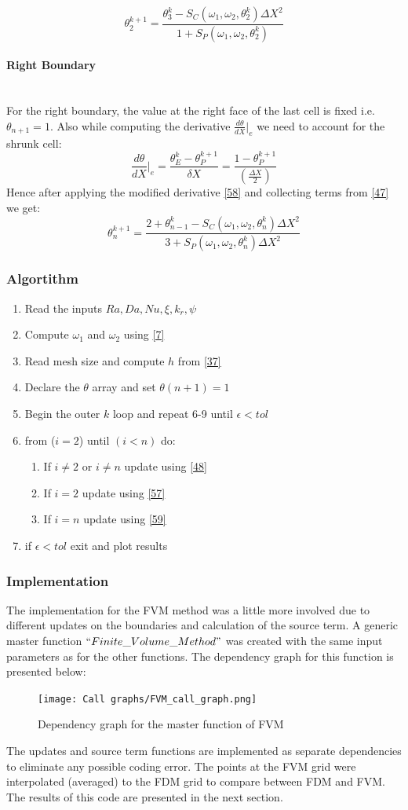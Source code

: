 \documentclass[12pt]{article}
\newcommand{\subsubsubsection}[1]{\paragraph{#1}\mbox{}\\}
\begin{document}
\[
\theta_2^{k+1} = \frac{\theta_3^k - S_C(\omega_1,\omega_2,\theta_2^k) \Delta X^2}{1 + S_P(\omega_1, \omega_2, \theta_2^k)} \label{57} \tag{57}
\]
\subsubsubsection{Right Boundary}
For the right boundary, the value at the right face of the last cell is fixed i.e. $\theta_{n+1} = 1$. Also while computing the derivative $\frac{d\theta}{dX}\Bigr|_e$ we need to account for the shrunk cell: 
\[
\frac{d\theta}{dX}\Bigr|_e = \frac{\theta_E^{k}-\theta_P^{k+1}}{\delta X} \tag{58} = \frac{1-\theta_P^{k+1}}{\left(\frac{\Delta X}{2}\right)}\label{58}
\]
Hence after applying the modified derivative \eqref{58} and collecting terms from \eqref{47} we get: 
\[
\theta_n^{k+1} = \frac{2 + \theta_{n-1}^k - S_C(\omega_1,\omega_2,\theta_n^k) \Delta X^2}{3 + S_P(\omega_1,\omega_2,\theta_n^k) \Delta X^2} \label{59} \tag{59}
\]
\subsubsection{Algortithm}
\begin{enumerate}
    \item Read the inputs $Ra, Da, Nu, \xi, k_r, \psi$
    \item Compute $\omega_1$ and $\omega_2$ using \eqref{7}
    \item Read mesh size and compute $h$ from \eqref{37}
    \item Declare the $\theta$ array and set $\theta(n+1)=1$
    \item Begin the outer $k$ loop and repeat 6-9 until $\epsilon<tol$
    \item from ($i=2$) until $(i<n)$ do: 
    \begin{enumerate}
        \item If $i\neq2$ or $i\neq n$ update using \eqref{48}
        \item If $i=2$ update using \eqref{57}
        \item If $i=n$ update using \eqref{59}
    \end{enumerate}
    \item if $\epsilon<tol$ exit and plot results
\end{enumerate}
\subsubsection{Implementation}
The implementation for the FVM method was a little more involved due to different updates on the boundaries and calculation of the source term. A generic master function $``Finite\_Volume\_Method"$ was created with the same input parameters as for the other functions. The dependency graph for this function is presented below: 
\begin{figure}
    \centering
    \texttt{[image: Call graphs/FVM\_call\_graph.png]}
    \caption{Dependency graph for the master function of FVM}
    \label{fig:30}
\end{figure}
The updates and source term functions are implemented as separate dependencies to eliminate any possible coding error. The points at the FVM grid were interpolated (averaged) to the FDM grid to compare between FDM and FVM. The results of this code are presented in the next section. 
\end{document}
